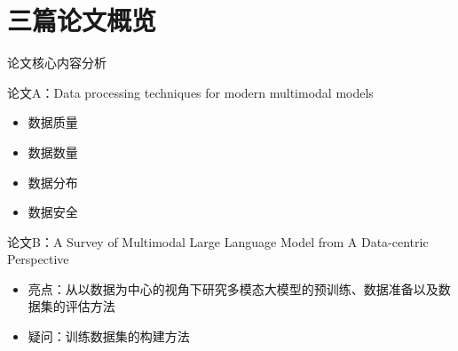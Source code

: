 \documentclass[aspectratio=169,AutoFakeBold]{beamer}
\begin{document}
\section{三篇论文概览}
\begin{frame}{论文核心内容分析}
    \begin{block}{论文A：Data processing techniques for modern multimodal models}
        \begin{itemize}
            \item 数据质量
            \item 数据数量
            \item 数据分布
            \item 数据安全
        \end{itemize}
    \end{block}

    \begin{block}{论文B：A Survey of Multimodal Large Language Model from A Data-centric Perspective}
        \begin{itemize}
            \item 亮点：从以数据为中心的视角下研究多模态大模型的预训练、数据准备以及数据集的评估方法
            \item 疑问：训练数据集的构建方法
        \end{itemize}
    \end{block}
\end{frame}
\end{document}
